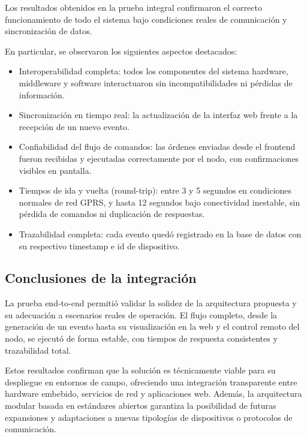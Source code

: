 Los resultados obtenidos en la prueba integral confirmaron el correcto funcionamiento de todo el sistema bajo condiciones reales de comunicación y sincronización de datos.  

En particular, se observaron los siguientes aspectos destacados:

\begin{itemize}
    \item Interoperabilidad completa: todos los componentes del sistema hardware, middleware y software interactuaron sin incompatibilidades ni pérdidas de información.
    \item Sincronización en tiempo real: la actualización de la interfaz web frente a la recepción de un nuevo evento.
    
    \item Confiabilidad del flujo de comandos: las órdenes enviadas desde el frontend fueron recibidas y ejecutadas correctamente por el nodo, con confirmaciones visibles en pantalla.
    \item Tiempos de ida y vuelta (round-trip): entre 3 y 5 segundos en condiciones normales de red GPRS, y hasta 12 segundos bajo conectividad inestable, sin pérdida de comandos ni duplicación de respuestas.
    \item Trazabilidad completa: cada evento quedó registrado en la base de datos con su respectivo timestamp e id de dispositivo.
\end{itemize}



\subsection{Conclusiones de la integración}

La prueba end-to-end permitió validar la solidez de la arquitectura propuesta y su adecuación a escenarios reales de operación.  
El flujo completo, desde la generación de un evento hasta su visualización en la web y el control remoto del nodo, se ejecutó de forma estable, con tiempos de respuesta consistentes y trazabilidad total.  

Estos resultados confirman que la solución es técnicamente viable para su despliegue en entornos de campo, ofreciendo una integración transparente entre hardware embebido, servicios de red y aplicaciones web.  
Además, la arquitectura modular basada en estándares abiertos garantiza la posibilidad de futuras expansiones y adaptaciones a nuevas tipologías de dispositivos o protocolos de comunicación.
 

